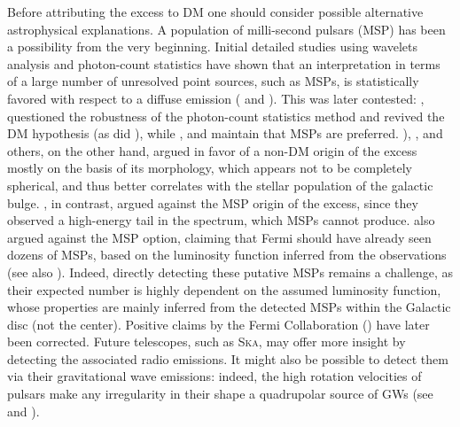 Before attributing the excess to DM one should consider possible alternative astrophysical explanations. 
A population of milli-second pulsars (MSP) has been a possibility from the very beginning. 
Initial detailed studies using wavelets analysis and photon-count statistics have shown that an interpretation in terms of a large number of unresolved point sources, such as MSPs, is statistically favored with respect to a diffuse emission ( and ). 
This was later contested: ,  questioned the robustness of the photon-count statistics method and revived the DM hypothesis (as did ),
while ,  and  maintain that MSPs are preferred. 
), ,  and others, on the other hand, argued in favor of a non-DM origin of the excess mostly on the basis of its morphology, which appears not to be completely spherical, and thus better correlates with the stellar population of the galactic bulge. 
, in contrast, argued against the MSP origin of the excess, since they observed a high-energy tail in the spectrum, which MSPs cannot produce.
 also argued against the MSP option, claiming that {\sc Fermi} should have already seen dozens of MSPs, based on the luminosity function inferred from the observations (see also ). 
Indeed, directly detecting these putative MSPs remains a challenge, as their expected number is highly dependent on the assumed luminosity function, whose properties are mainly inferred from the detected MSPs within the Galactic disc (not the center).
Positive claims by the {\sc Fermi} Collaboration () have later been corrected. 
Future telescopes, such as \textsc{Ska}, may offer more insight by detecting the associated radio emissions.
It might also be possible to detect them via their gravitational wave emissions: indeed, the high rotation velocities of pulsars make any irregularity in their shape a quadrupolar source of GWs (see  and ).



